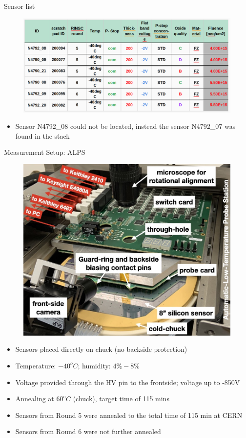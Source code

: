 \documentclass{beamer}
\begin{document}
\begin{frame}{Sensor list}
  \begin{figure}
      \includegraphics[width=.45\textwidth]{plots/Sensors.png}
  \end{figure}

  \begin{itemize}
      \small
      \item Sensor N4792\_08 could not be located, instead the sensor N4792\_07 was found in the stack
  \end{itemize}
\end{frame}


\begin{frame}{Measurement Setup: ALPS}
    \begin{figure}
        \includegraphics[width=.45\textwidth]{plots/ALPS_setup.png}
    \end{figure}
  
    \begin{itemize}
        \small
        \item Sensors placed directly on chuck (no backside protection)
        \item Temperature: $-40^oC$; humidity: $ 4\% - 8\%$
        \item Voltage provided through the HV pin to the frontside;  voltage up to \alert{-850V}
        \item Annealing at $60^oC$ (chuck), target time of 115 mins
        \item Sensors from Round 5 were annealed to the total time of 115 min at CERN 
        \item Sensors from Round 6 were not further annealed
    \end{itemize}
\end{frame}
  
\end{document}
